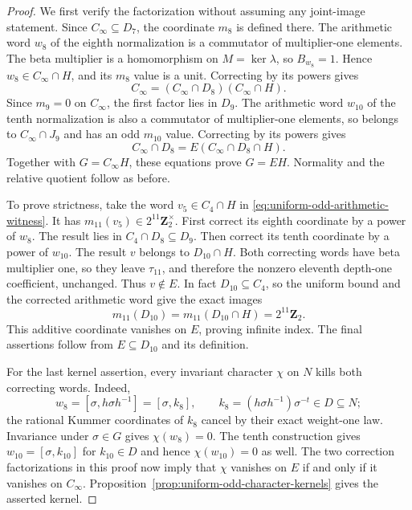 \begin{proof}
We first verify the factorization without assuming any joint-image
statement. Since $C_\infty\subseteq D_7$, the coordinate $m_8$
is defined there. The arithmetic word $w_8$ of the eighth
normalization is a commutator of multiplier-one elements. The
beta multiplier is a homomorphism on $M=\ker\lambda$, so
$B_{w_8}=1$. Hence $w_8\in C_\infty\cap H$, and its $m_8$
value is a unit. Correcting by its powers gives
\[
 C_\infty=(C_\infty\cap D_8)(C_\infty\cap H).
\]
Since $m_9=0$ on $C_\infty$, the first factor lies in $D_9$.
The arithmetic word $w_{10}$ of the tenth normalization is also
a commutator of multiplier-one elements, so belongs to
$C_\infty\cap J_9$ and has an odd $m_{10}$ value. Correcting
by its powers gives
\[
 C_\infty\cap D_8=E(C_\infty\cap D_8\cap H).
\]
Together with $G=C_\infty H$, these equations prove $G=EH$.
Normality and the relative quotient follow as before.

To prove strictness, take the word $v_5\in C_4\cap H$ in
\eqref{eq:uniform-odd-arithmetic-witness}. It has
$m_{11}(v_5)\in2^{11}\mathbf Z_2^{\times}$.
First correct its eighth coordinate by a power of $w_8$.
The result lies in $C_4\cap D_8\subseteq D_9$.
Then correct its tenth coordinate by a power of $w_{10}$.
The result $v$ belongs to $D_{10}\cap H$.
Both correcting words have beta multiplier one, so they leave
$\tau_{11}$, and therefore the nonzero eleventh depth-one
coefficient, unchanged. Thus $v\notin E$.
In fact $D_{10}\subseteq C_4$, so the uniform bound and the
corrected arithmetic word give the exact images
\[
 m_{11}(D_{10})=m_{11}(D_{10}\cap H)=2^{11}\mathbf Z_2.
\]
This additive coordinate vanishes on $E$, proving infinite index. The final assertions follow
from $E\subseteq D_{10}$ and its definition.

For the last kernel assertion, every invariant character $\chi$ on
$N$ kills both correcting words. Indeed,
\[
 w_8=[\sigma,h\sigma h^{-1}]=[\sigma,k_8],\qquad
 k_8=(h\sigma h^{-1})\sigma^{-t}\in D\subseteq N;
\]
the rational Kummer coordinates of $k_8$ cancel by their exact
weight-one law. Invariance under $\sigma\in G$ gives
$\chi(w_8)=0$. The tenth construction gives
$w_{10}=[\sigma,k_{10}]$ for $k_{10}\in D$ and hence
$\chi(w_{10})=0$ as well. The two correction factorizations in
this proof now imply that $\chi$ vanishes on $E$ if and only if
it vanishes on $C_\infty$. Proposition~\ref{prop:uniform-odd-character-kernels}
gives the asserted kernel.
\end{proof}
